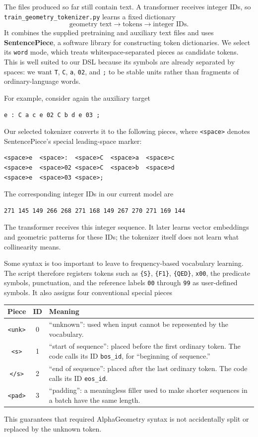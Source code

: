 \documentclass[reqno]{amsart}
\newcommand{\keyterm}[1]{\textbf{\color{agblue}#1}}
\DeclareMathOperator{\1}{\textbf{1}}
\begin{document}
The files produced so far still contain text.  A transformer receives integer
IDs, so \verb|train_geometry_tokenizer.py| learns a fixed dictionary
\[
\text{geometry text}\longrightarrow\text{tokens}\longrightarrow
\text{integer IDs}.
\]
It combines the supplied pretraining and auxiliary text files and uses
\keyterm{SentencePiece}, a software library for constructing token
dictionaries.  We select its \verb|word| mode, which treats
whitespace-separated pieces as candidate tokens.  This is well suited to our
DSL because its symbols are already separated by spaces: we want \verb|T|,
\verb|C|, \verb|a|, \verb|02|, and \verb|;| to be stable units rather than
fragments of ordinary-language words.

For example, consider again the auxiliary target
\begin{lstlisting}
e : C a c e 02 C b d e 03 ;
\end{lstlisting}
Our selected tokenizer converts it to the following pieces, where
\verb|<space>| denotes SentencePiece's special leading-space marker:
\begin{lstlisting}
<space>e  <space>:  <space>C  <space>a  <space>c
<space>e  <space>02 <space>C  <space>b  <space>d
<space>e  <space>03 <space>;
\end{lstlisting}
The corresponding integer IDs in our current model are
\begin{lstlisting}
271 145 149 266 268 271 168 149 267 270 271 169 144
\end{lstlisting}
The transformer receives this integer sequence.  It later learns vector
embeddings and geometric patterns for these IDs; the tokenizer itself does not
learn what collinearity means.

Some syntax is too important to leave to frequency-based vocabulary learning.
The script therefore registers tokens such as \verb|{S}|, \verb|{F1}|,
\verb|{QED}|, \verb|x00|, the predicate symbols, punctuation, and the reference
labels \verb|00| through \verb|99| as user-defined symbols.  It also assigns
four conventional special pieces
\begin{center}
\begin{tabular}{c|c|p{}}
\textbf{Piece} & \textbf{ID} & \textbf{Meaning} \\
\hline
\texttt{<unk>} & 0 & ``unknown'': used when input cannot be represented by the
vocabulary. \\
\texttt{<s>} & 1 & ``start of sequence'': placed before the first ordinary
token.  The code calls its ID \texttt{bos\_id}, for ``beginning of sequence.'' \\
\texttt{</s>} & 2 & ``end of sequence'': placed after the last ordinary token.
The code calls its ID \texttt{eos\_id}. \\
\texttt{<pad>} & 3 & ``padding'': a meaningless filler used to make shorter
sequences in a batch have the same length.
\end{tabular}
\end{center}
This guarantees that required AlphaGeometry syntax is not accidentally split
or replaced by the unknown token.
\end{document}
